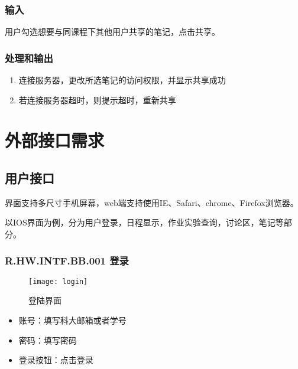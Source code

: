     \subsubsection{输入}
	   用户勾选想要与同课程下其他用户共享的笔记，点击共享。
    \subsubsection{处理和输出}
    \begin{enumerate}
      \item 连接服务器，更改所选笔记的访问权限，并显示共享成功
      \item 若连接服务器超时，则提示超时，重新共享
    \end{enumerate}

\section{外部接口需求}
  \subsection{用户接口}
  界面支持多尺寸手机屏幕，web端支持使用IE、Safari、chrome、Firefox浏览器。\par
  以IOS界面为例，分为用户登录，日程显示，作业实验查询，讨论区，笔记等部分。
    \subsubsection{R.HW.INTF.BB.001 登录}
    \begin{figure}[H]
    \centering
    \texttt{[image: login]}
    \caption{登陆界面}
    \end{figure}
    \begin{itemize}
      \item 账号：填写科大邮箱或者学号
      \item 密码：填写密码
      \item 登录按钮：点击登录
    \end{itemize}
